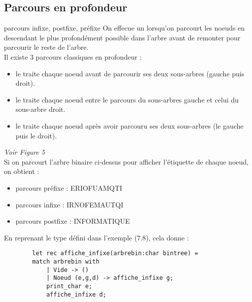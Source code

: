  \subsection{Parcours en profondeur}
 \begin{definition}{7.15}{parcours infixe, postfixe, préfixe}
    On effecue un  lorsqu'on parcourt les noeuds en descendant le plus profondément possible dans l'arbre avant de remonter pour parcourir le reste de l'arbre. \\Il existe 3 parcours classiques en profondeur : \begin{itemize}
        \item le  traite chaque noeud avant de parcourir ses deux sous-arbres (gauche puis droit).
        \item le  traite chaque noeud entre le parcours du sous-arbres gauche et celui du sous-arbre droit.
        \item le  traite chaque noeud après avoir parcouru ses deux sous-arbres (le gauche puis le droit).
    \end{itemize}
 \end{definition}

\begin{exemple}{7.16}
    \textit{Voir Figure 5} \\
    Si on parcourt l'arbre binaire ci-dessus pour afficher l'étiquette de chaque noeud, on obtient : \begin{itemize}
        \item parcours préfixe : ERIOFUAMQTI
        \item parcours infixe : IRNOFEMAUTQI
        \item parcours postfixe : INFORMATIQUE
    \end{itemize}
    En reprenant le type défini dans l'exemple (7.8), cela donne :
    \begin{verbatim}
        let rec affiche_infixe(arbrebin:char bintree) =
        match arbrebin with
            | Vide -> ()
            | Noeud (e,g,d) -> affiche_infixe g;
            print_char e;
            affiche_infixe d;
    \end{verbatim}
\end{exemple}



